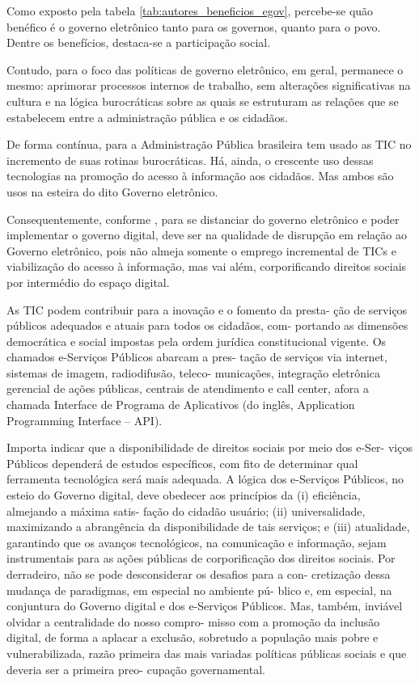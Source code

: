 Como exposto pela tabela \ref{tab:autores_beneficios_egov}, percebe-se quão benéfico é o governo eletrônico tanto para os governos, quanto para o povo. Dentre os benefícios, destaca-se a participação social.

Contudo, para \cite{de2020governo} o foco das políticas de governo eletrônico, em geral, permanece o mesmo: aprimorar processos internos de  trabalho, sem alterações significativas na cultura e na lógica burocráticas sobre as quais se estruturam as relações que se estabelecem entre a administração pública e os cidadãos.

De forma contínua, para \cite{cristovam2020governo} a Administração Pública brasileira tem usado as TIC no incremento de suas rotinas burocráticas. Há, ainda, o crescente uso dessas tecnologias na promoção do acesso à informação aos cidadãos. Mas ambos são usos na esteira do dito Governo eletrônico.

Consequentemente, conforme \cite{cristovam2020governo}, para se distanciar do governo eletrônico e poder implementar o governo digital, deve ser na qualidade de disrupção em relação ao Governo eletrônico, pois não almeja somente o emprego incremental de TICs e viabilização do acesso à informação, mas vai além, corporificando direitos sociais por intermédio do espaço digital.

As TIC podem contribuir para a inovação e o fomento da presta-
ção de serviços públicos adequados e atuais para todos os cidadãos, com-
portando as dimensões democrática e social impostas pela ordem jurídica
constitucional vigente. Os chamados e-Serviços Públicos abarcam a pres-
tação de serviços via internet, sistemas de imagem, radiodifusão, teleco-
municações, integração eletrônica gerencial de ações públicas, centrais
de atendimento e call center, afora a chamada Interface de Programa de
Aplicativos (do inglês, Application Programming Interface – API).

Importa indicar que a disponibilidade de direitos sociais por meio dos e-Ser-
viços Públicos dependerá de estudos específicos, com fito de determinar
qual ferramenta tecnológica será mais adequada.
A lógica dos e-Serviços Públicos, no esteio do Governo digital,
deve obedecer aos princípios da (i) eficiência, almejando a máxima satis-
fação do cidadão usuário; (ii) universalidade, maximizando a abrangência
da disponibilidade de tais serviços; e (iii) atualidade, garantindo que os
avanços tecnológicos, na comunicação e informação, sejam instrumentais
para as ações públicas de corporificação dos direitos sociais.
Por derradeiro, não se pode desconsiderar os desafios para a con-
cretização dessa mudança de paradigmas, em especial no ambiente pú-
blico e, em especial, na conjuntura do Governo digital e dos e-Serviços
Públicos. Mas, também, inviável olvidar a centralidade do nosso compro-
misso com a promoção da inclusão digital, de forma a aplacar a exclusão,
sobretudo a população mais pobre e vulnerabilizada, razão primeira das
mais variadas políticas públicas sociais e que deveria ser a primeira preo-
cupação governamental.

